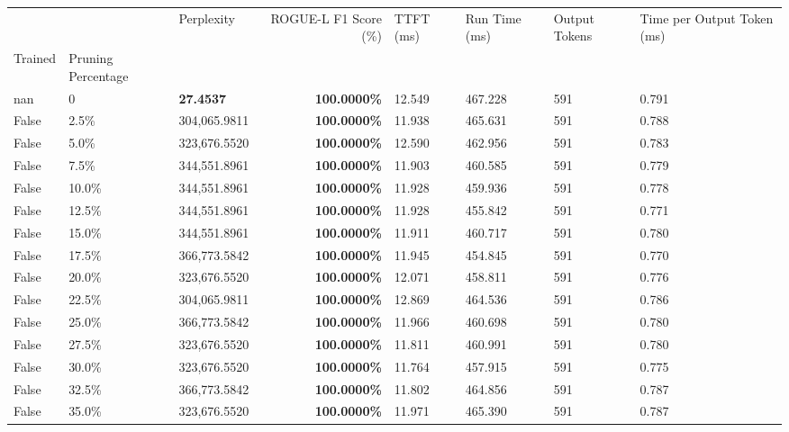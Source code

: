 \begin{table}[H]
\label{tab:evaluation-pipeline-4-untrained}
\begin{tabular}{lllrllll}
\toprule
 &  & Perplexity & ROGUE-L F1 Score (\%) & TTFT (ms) & Run Time (ms) & Output Tokens & Time per Output Token (ms) \\
Trained & Pruning Percentage &  &  &  &  &  &  \\
\midrule
nan & 0 & \bfseries 27.4537 & \bfseries 100.0000\% & 12.549 & 467.228 & 591 & 0.791 \\
\cline{1-8}
False & 2.5\% & 304,065.9811 & \bfseries \color{red} 100.0000\% & 11.938 & 465.631 & 591 & 0.788 \\
\cline{1-8}
False & 5.0\% & 323,676.5520 & \bfseries \color{red} 100.0000\% & 12.590 & 462.956 & 591 & 0.783 \\
\cline{1-8}
False & 7.5\% & 344,551.8961 & \bfseries \color{red} 100.0000\% & 11.903 & 460.585 & 591 & 0.779 \\
\cline{1-8}
False & 10.0\% & 344,551.8961 & \bfseries \color{red} 100.0000\% & 11.928 & 459.936 & 591 & 0.778 \\
\cline{1-8}
False & 12.5\% & 344,551.8961 & \bfseries \color{red} 100.0000\% & 11.928 & 455.842 & 591 & 0.771 \\
\cline{1-8}
False & 15.0\% & 344,551.8961 & \bfseries \color{red} 100.0000\% & 11.911 & 460.717 & 591 & 0.780 \\
\cline{1-8}
False & 17.5\% & 366,773.5842 & \bfseries \color{red} 100.0000\% & 11.945 & 454.845 & 591 & 0.770 \\
\cline{1-8}
False & 20.0\% & 323,676.5520 & \bfseries \color{red} 100.0000\% & 12.071 & 458.811 & 591 & 0.776 \\
\cline{1-8}
False & 22.5\% & 304,065.9811 & \bfseries \color{red} 100.0000\% & 12.869 & 464.536 & 591 & 0.786 \\
\cline{1-8}
False & 25.0\% & 366,773.5842 & \bfseries \color{red} 100.0000\% & 11.966 & 460.698 & 591 & 0.780 \\
\cline{1-8}
False & 27.5\% & 323,676.5520 & \bfseries \color{red} 100.0000\% & 11.811 & 460.991 & 591 & 0.780 \\
\cline{1-8}
False & 30.0\% & 323,676.5520 & \bfseries \color{red} 100.0000\% & 11.764 & 457.915 & 591 & 0.775 \\
\cline{1-8}
False & 32.5\% & 366,773.5842 & \bfseries \color{red} 100.0000\% & 11.802 & 464.856 & 591 & 0.787 \\
\cline{1-8}
False & 35.0\% & 323,676.5520 & \bfseries \color{red} 100.0000\% & 11.971 & 465.390 & 591 & 0.787 \\

\end{tabular}
\end{table}
